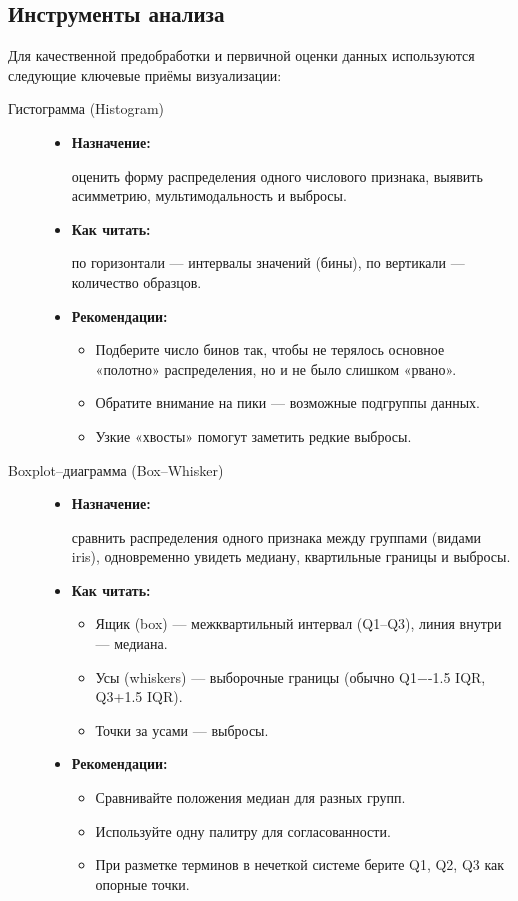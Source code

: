 \subsection{Инструменты анализа}

Для качественной предобработки и первичной оценки данных используются следующие ключевые приёмы визуализации:

\begin{description}
  \item[Гистограмма (Histogram)]  
    \hfill 
    \begin{itemize}
      \item \textbf{Назначение:} 
        
        оценить форму распределения одного числового признака, выявить асимметрию, мультимодальность и выбросы.
      \item \textbf{Как читать:} 
        
        по горизонтали — интервалы значений (бины), по вертикали — количество образцов.  
      \item \textbf{Рекомендации:}  
        \begin{itemize}
          \item Подберите число бинов так, чтобы не терялось основное «полотно» распределения, но и не было слишком «рвано».  
          \item Обратите внимание на пики — возможные подгруппы данных.  
          \item Узкие «хвосты» помогут заметить редкие выбросы.
        \end{itemize} 
    \end{itemize}

  \item[Boxplot–диаграмма (Box–Whisker)]  
    \hfill
    \begin{itemize}
      \item \textbf{Назначение:} 
        
        сравнить распределения одного признака между группами (видами iris), одновременно увидеть медиану, квартильные границы и выбросы.
      \item \textbf{Как читать:}  
        \begin{itemize}
          \item Ящик (box) — межквартильный интервал (Q1–Q3), линия внутри — медиана.  
          \item Усы (whiskers) — выборочные границы (обычно Q1−-1.5 \cdot IQR, Q3+1.5 \cdot IQR).  
          \item Точки за усами — выбросы.
        \end{itemize}
      \item \textbf{Рекомендации:}  
        \begin{itemize}
          \item Сравнивайте положения медиан для разных групп.  
          \item Используйте одну палитру для согласованности.  
          \item При разметке терминов в нечеткой системе берите Q1, Q2, Q3 как опорные точки.
        \end{itemize}
    \end{itemize}


\end{description}

